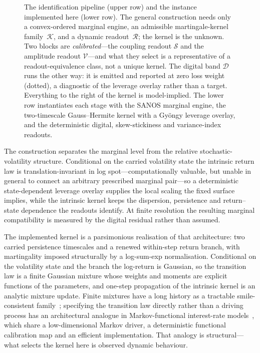 \documentclass[11pt]{article}
\providecommand{\Kfam}{\mathcal{K}}
\providecommand{\Rcal}{\mathcal R}
\providecommand{\1}{\mathbf 1}
\begin{document}
\begin{figure}[t]
\begin{tikzpicture}
\end{tikzpicture}
\caption{The identification pipeline (upper row) and the instance implemented here (lower row).
The general construction needs only a convex-ordered marginal engine, an admissible martingale-kernel
family~$\Kfam$, and a dynamic readout~$\Rcal$; the kernel is the unknown. Two blocks are
\emph{calibrated}---the coupling readout $\mathcal S$ and the amplitude readout $\mathcal
V$---and what they select is a representative of a readout-equivalence class, not a unique kernel.
The digital band $\mathcal D$ runs the other way: it is emitted and reported at zero loss weight
(dotted), a diagnostic of the leverage overlay rather than a target. Everything to the right of the
kernel is model-implied. The lower row instantiates each stage with the SANOS marginal engine, the
two-timescale Gauss--Hermite kernel with a Gy\"ongy leverage overlay, and the deterministic digital,
skew-stickiness and variance-index readouts.}
\label{fig:architecture}
\end{figure}

The construction separates the marginal level from the relative stochastic-volatility structure.
Conditional on the carried volatility state the intrinsic return law is translation-invariant in log
spot---computationally valuable, but unable in general to connect an arbitrary prescribed marginal
pair---so a deterministic state-dependent leverage overlay supplies the local scaling the fixed
surface implies, while the intrinsic kernel keeps the dispersion, persistence and return--state
dependence the readouts identify. At finite resolution the resulting marginal compatibility is
measured by the digital residual rather than assumed.

The implemented kernel is a parsimonious realisation of that architecture: two carried persistence
timescales and a renewed within-step return branch, with martingality imposed structurally by a
log-sum-exp normalisation. Conditional on the volatility state and the branch the log-return is
Gaussian, so the transition law is a finite Gaussian mixture whose weights and moments are explicit
functions of the parameters, and one-step propagation of the intrinsic kernel is an analytic mixture
update. Finite mixtures have a long history as a tractable smile-consistent
family~\cite{brigo2002}; specifying the transition law directly rather than a driving process has an
architectural analogue in Markov-functional interest-rate
models~\cite{huntkennedypelsser2000}, which share a low-dimensional Markov driver, a deterministic
functional calibration map and an efficient implementation. That analogy is structural---what
selects the kernel here is observed dynamic behaviour.
\end{document}
